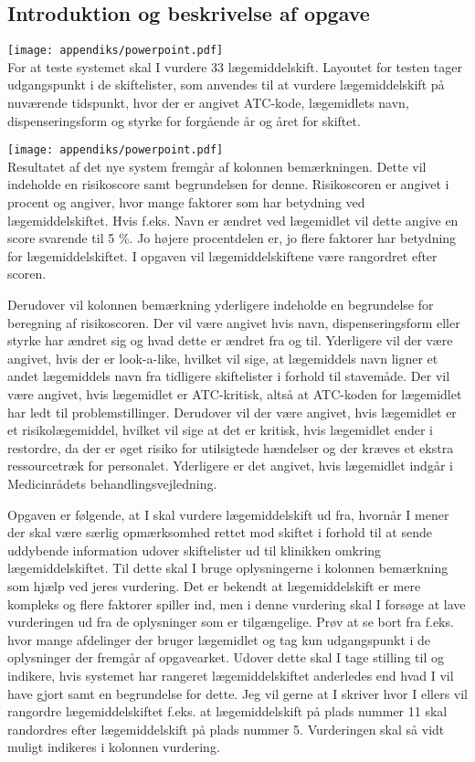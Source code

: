 \subsection{Introduktion og beskrivelse af opgave}
\vspace{-0.3cm}
\texttt{[image: appendiks/powerpoint.pdf]} \\
For at teste systemet skal I vurdere 33 lægemiddelskift. Layoutet for testen tager udgangspunkt i de skiftelister, som anvendes til at vurdere lægemiddelskift på nuværende tidspunkt, hvor der er angivet ATC-kode, lægemidlets navn, dispenseringsform og styrke for forgående år og året for skiftet.


\texttt{[image: appendiks/powerpoint.pdf]} \\
Resultatet af det nye system fremgår af kolonnen bemærkningen. Dette vil indeholde en risikoscore samt begrundelsen for denne. Risikoscoren er angivet i procent og angiver, hvor mange faktorer som har betydning ved lægemiddelskiftet. Hvis f.eks. Navn er ændret ved lægemidlet vil dette angive en score svarende til 5 \%. Jo højere procentdelen er, jo flere faktorer har betydning for lægemiddelskiftet. I opgaven vil lægemiddelskiftene være rangordret efter scoren.  

Derudover vil kolonnen bemærkning yderligere indeholde en begrundelse for beregning af risikoscoren. Der vil være angivet hvis navn, dispenseringsform eller styrke har ændret sig og hvad dette er ændret fra og til. Yderligere vil der være angivet, hvis der er look-a-like, hvilket vil sige, at lægemiddels navn ligner et andet lægemiddels navn fra tidligere skiftelister i forhold til stavemåde. Der vil være angivet, hvis lægemidlet er ATC-kritisk, altså at ATC-koden for lægemidlet har ledt til problemstillinger. Derudover vil der være angivet, hvis lægemidlet er et risikolægemiddel, hvilket vil sige at det er kritisk, hvis lægemidlet ender i restordre, da der er øget risiko for utilsigtede hændelser og der kræves et ekstra ressourcetræk for personalet. Yderligere er det angivet, hvis lægemidlet indgår i Medicinrådets behandlingsvejledning. 

Opgaven er følgende, at I skal vurdere lægemiddelskift ud fra, hvornår I mener der skal være særlig opmærksomhed rettet mod skiftet i forhold til at sende uddybende information udover skiftelister ud til klinikken omkring lægemiddelskiftet. Til dette skal I bruge oplysningerne i kolonnen bemærkning som hjælp ved jeres vurdering. Det er bekendt at lægemiddelskift er mere kompleks og flere faktorer spiller ind, men i denne vurdering skal I forsøge at lave vurderingen ud fra de oplysninger som er tilgængelige. Prøv at se bort fra f.eks. hvor mange afdelinger der bruger lægemidlet og tag kun udgangspunkt i de oplysninger der fremgår af opgavearket. Udover dette skal I tage stilling til og indikere, hvis systemet har rangeret lægemiddelskiftet anderledes end hvad I vil have gjort samt en begrundelse for dette. Jeg vil gerne at I skriver hvor I ellers vil rangordre lægemiddelskiftet f.eks. at lægemiddelskift på plads nummer 11 skal randordres efter lægemiddelskift på plads nummer 5. Vurderingen skal så vidt muligt indikeres i kolonnen vurdering.

